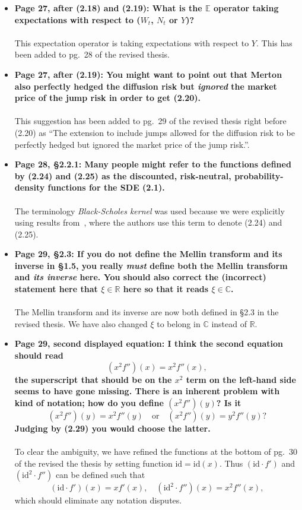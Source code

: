 \documentclass{article}
\begin{document}
\begin{enumerate}
\begin{itemize}
			\item{\textbf{Page 27, after (2.18) and (2.19): What is the $\mathbb{E}$ operator taking expectations with respect to ($W_t$, $N_t$ or $Y$)?\\\\}}
			This expectation operator is taking expectations with respect to $Y$. This has been added to pg.~28 of the revised thesis.
			\item{\textbf{Page 27, after (2.19): You might want to point out that Merton also perfectly hedged the diffusion risk but \emph{ignored} the market price of the jump risk in order to get (2.20).
			\\\\}}
			This suggestion has been added to pg.~29 of the revised thesis right before (2.20) as ``The extension to include jumps allowed for the diffusion risk to be perfectly hedged but ignored the market price of the jump risk.''.
			
			\item{\textbf{Page 28, \S2.2.1: Many people might refer to the functions defined by (2.24) and (2.25) as the discounted, risk-neutral, probability-density functions for the SDE (2.1).
			\\\\}}
			The terminology \emph{Black-Scholes kernel} was used because we were explicitly using results from~\cite{Rodrigo2006, Rodrigo2013}, where the authors use this term to denote (2.24) and (2.25).
			
			\item{\textbf{Page 29, \S2.3: If you do not define the Mellin transform and its inverse in \S1.5, you really \emph{must} define both the Mellin transform and \emph{its inverse} here. You should also correct the (incorrect) statement here that $\xi \in \mathbb{R}$ here so that it reads $\xi \in \mathbb{C}$.
			\\\\}}
			The Mellin transform and its inverse are now both defined in \S2.3 in the revised thesis. We have also changed $\xi$ to belong in $\mathbb{C}$ instead of $\mathbb{R}$.
			
			\item{\textbf{Page 29, second displayed equation: I think the second equation should read
				$$
					(x^2f'')(x) = x^2f''(x),
				$$
				the superscript that should be on the $x^2$ term on the left-hand side seems to have gone missing. There is an inherent problem with kind of notation; how do you define $(x^2f'')(y)$? Is it
				$$
					(x^2f'')(y) = x^2f''(y) \quad \text{or} \quad (x^2f'')(y) = y^2f''(y)?		
				$$
				Judging by (2.29) you would choose the latter.
			\\\\}}
			To clear the ambiguity, we have refined the functions at the bottom of pg.~30 of the revised the thesis by setting function $\text{id} = \text{id}(x)$. Thus $(\text{id}\cdot f')$ and $(\text{id}^2 \cdot f'')$ can be defined such that
			$$
				(\text{id}\cdot f')(x) = x f'(x), \quad (\text{id}^2\cdot f'')(x) = x^2 f''(x),
			$$
			which should eliminate any notation disputes.
			

\end{itemize}
\end{enumerate}
\end{document}

